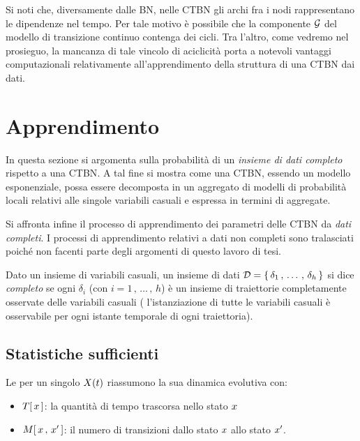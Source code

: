 Si noti che, diversamente dalle \acl{BN}, nelle \acl{CTBN} gli archi fra i nodi rappresentano le dipendenze nel tempo. Per tale motivo è possibile che la componente $\mathcal{G}$ del modello di transizione continuo contenga dei cicli. Tra l'altro, come vedremo nel prosieguo, la mancanza di tale vincolo di aciclicità porta a notevoli vantaggi computazionali relativamente all'apprendimento della struttura di una \acs{CTBN} dai dati.

\section{Apprendimento}
\label{sec:ctbn-apprendimento}
In questa sezione si argomenta sulla probabilità di un \emph{insieme di dati completo} rispetto a una \acl{CTBN}. A tal fine si mostra come una \acs{CTBN}, essendo un modello esponenziale, possa essere decomposta in un aggregato di modelli di probabilità locali relativi alle singole variabili casuali e espressa in termini di \emph{\stats{}} aggregate.

Si affronta infine il processo di apprendimento dei parametri delle \acl{CTBN} da \emph{dati completi}. I processi di apprendimento relativi a dati non completi sono tralasciati poiché non facenti parte degli argomenti di questo lavoro di tesi.

\begin{definizione}
\label{defn:dataset-completo}
Dato un insieme di variabili casuali, un insieme di dati $\mathcal{D}=\{\,\delta_1\,,\,\dotsc\,,\,\delta_h\,\}$ si dice \emph{completo} se ogni $\delta_i$ (con $i=1\,,\,\dotsc\,,\,h$) è un insieme di traiettorie completamente osservate delle variabili casuali (\ie{} l'istanziazione di tutte le variabili casuali è osservabile per ogni istante temporale di ogni traiettoria).
\end{definizione}

\subsection{Statistiche sufficienti}
\label{sec:ctbn-sufficient-stats}
Le \emph{\stats{}} per un singolo \mprocess*{} \omog*{} $\mathnormal{X}(t)$ riassumono la sua dinamica evolutiva con:
\begin{itemize}
    \item $T[\,\mathnormal{x}\,]$: la quantità di tempo trascorsa nello stato $\mathnormal{x}$
    \item $\mstat[x]{\setel{x}^\prime}$: il numero di transizioni dallo stato $\mathnormal{x}$ allo stato $\mathnormal{x}^\prime$.
\end{itemize}

